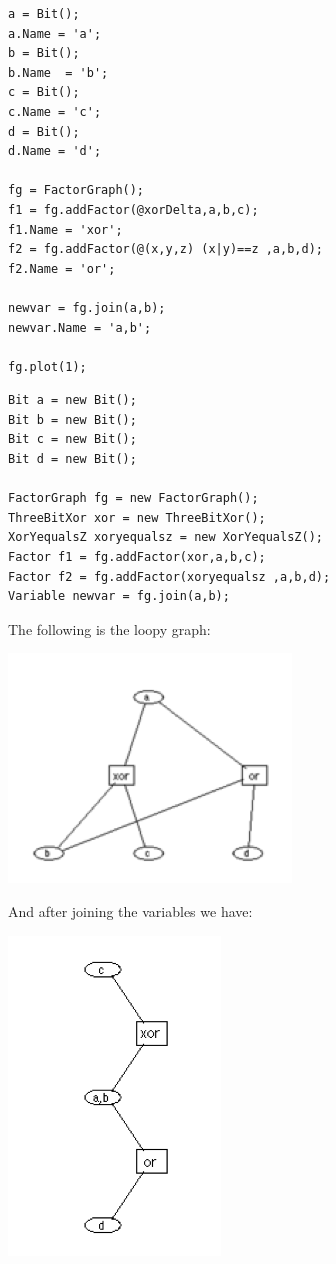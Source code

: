 \ifmatlab

\begin{lstlisting}
a = Bit(); 
a.Name = 'a'; 
b = Bit();
b.Name  = 'b';
c = Bit();
c.Name = 'c';
d = Bit();
d.Name = 'd';

fg = FactorGraph();
f1 = fg.addFactor(@xorDelta,a,b,c);
f1.Name = 'xor';
f2 = fg.addFactor(@(x,y,z) (x|y)==z ,a,b,d);
f2.Name = 'or';
 
newvar = fg.join(a,b);
newvar.Name = 'a,b';

fg.plot(1);
\end{lstlisting}

\fi

\ifjava
\begin{lstlisting}
Bit a = new Bit(); 
Bit b = new Bit();
Bit c = new Bit();
Bit d = new Bit();

FactorGraph fg = new FactorGraph();
ThreeBitXor xor = new ThreeBitXor();
XorYequalsZ xoryequalsz = new XorYequalsZ();
Factor f1 = fg.addFactor(xor,a,b,c);
Factor f2 = fg.addFactor(xoryequalsz ,a,b,d);
Variable newvar = fg.join(a,b);
\end{lstlisting}
\fi

The following is the loopy graph:

\includegraphics{images/LoopyGraph.png}
  
And after joining the variables we have:

\includegraphics{images/NonLoopyGraph.png}


